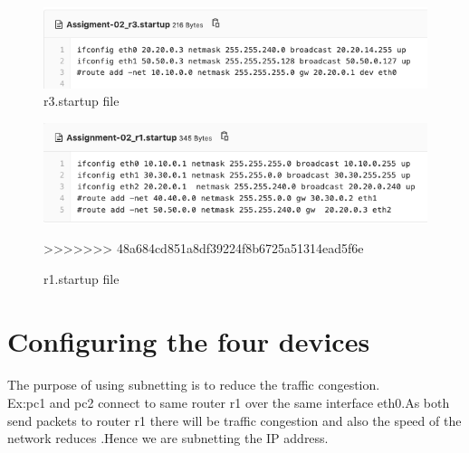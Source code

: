\begin{figure}[H]
\centering
  \includegraphics[width=400pt]{Images/r3.startup.png}
  \caption{r3.startup file}
  \label{fig:3.2}
\end{figure}
\begin{figure}[H]
\centering
  \includegraphics[width=400pt]{Images/r1.startup.png}
  \caption{r1.startup file}
  \label{fig:3.2}
>>>>>>> 48a684cd851a8df39224f8b6725a51314ead5f6e
\end{figure}
\section{Configuring the four devices}
\paragraph{}
The purpose of using subnetting is to reduce the traffic congestion.
\\Ex:pc1 and pc2 connect to same router r1 over the same interface eth0.As both send packets to router r1 there will be traffic congestion and also the speed of the network reduces .Hence we are subnetting the IP address.
